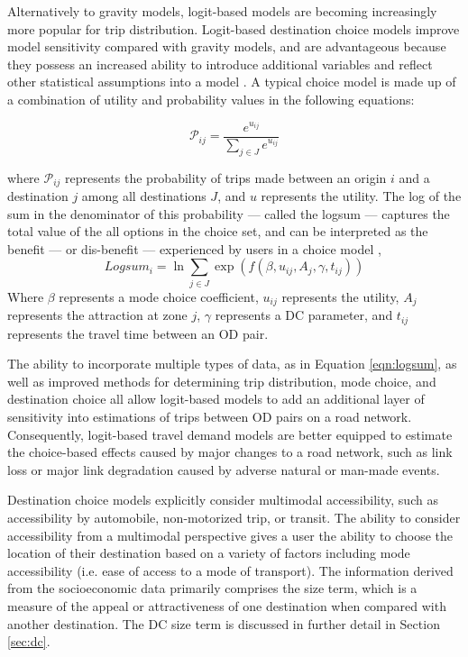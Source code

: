 Alternatively to gravity models, logit-based models are becoming
increasingly more popular for trip distribution. Logit-based destination choice models improve model
sensitivity compared with gravity models, and are advantageous because
they possess an increased ability to introduce additional variables and reflect
other statistical assumptions into a model \citep{tfr2021}. A typical choice
model is made up of a combination of utility and probability values in the
following equations:

\begin{equation}
\mathcal{P}_{ij} = \frac{e^{u_{ij}}}{\sum_{j\in J}e^{u_{ij}}}
  \label{eqn:probability}
\end{equation}

\noindent where $\mathcal{P}_{ij}$ represents the probability of trips made between an
origin \(i\) and a destination \(j\) among all destinations $J$, and \(u\) represents the utility.
The log of the sum in the denominator of this probability --- called the logsum --- captures the total value of the all options in the choice set, and can be interpreted as the
benefit --- or dis-benefit --- experienced by users in a choice model \citep{williams1974},
\begin{equation}
 Logsum_{i} = \ln\sum_{j\in J}\exp(f(\beta, u_{ij}, A_j, \gamma, t_{ij}))
  \label{eqn:logsum}
\end{equation}
Where $\beta$ represents a mode choice coefficient, $u_{ij}$ represents the utility,
$A_j$ represents the attraction at zone $j$, $\gamma$ represents
a DC parameter, and $t_{ij}$ represents the travel time between an OD pair.

The ability to incorporate multiple types of data, as in Equation \ref{eqn:logsum}, as well as improved methods
for determining trip distribution, mode choice, and destination choice all allow
logit-based models to add an additional layer of sensitivity into estimations of
trips between OD pairs on a road network. Consequently, logit-based travel
demand models are better equipped to estimate the choice-based effects caused
by major changes to a road network, such as link loss or major link degradation
caused by adverse natural or man-made events.

Destination choice models explicitly consider multimodal accessibility, such as accessibility by automobile,
non-motorized trip, or transit. The ability to consider accessibility from a
multimodal perspective gives a user the ability to choose the location of
their destination based on a variety of factors including mode accessibility
(i.e. ease of access to a mode of transport). The information
derived from the socioeconomic data primarily comprises the size term, which
is a measure of the appeal or attractiveness of one destination when compared with
another destination. The DC size term is discussed in further detail in
Section \ref{sec:dc}.


